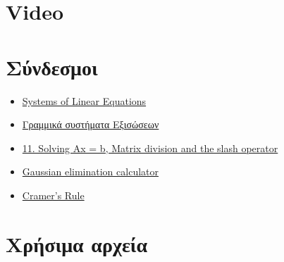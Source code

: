 \documentclass[14pt]{extreport}
\begin{document}
\section{Video}
\section{Σύνδεσμοι}
\begin{itemize}
    \item \href{http://sites.science.oregonstate.edu/math/home/programs/undergrad/CalculusQuestStudyGuides/vcalc/system/system.html}{Systems of Linear Equations}
    \item \href{http://esperia.iesl.forth.gr/~kafesaki/Applied-Mathematics/linear-algebra/linear-systems.pdf}{Γραμμικά συστήματα Εξισώσεων}
    \item \href{http://www-h.eng.cam.ac.uk/help/programs/octave/tutorial/}{11. Solving Ax = b, Matrix division and the slash operator}
    \item \href{https://onlinemschool.com/math/assistance/equation/gaus/}{Gaussian elimination calculator}
    \item \href{http://www.matrixlab-examples.com/cramers-rule.html}{Cramer's Rule}
\end{itemize}
\section{Χρήσιμα αρχεία}
\end{document}

